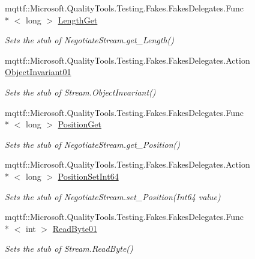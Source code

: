 \begin{DoxyCompactItemize}
mqttf\-::\-Microsoft.\-Quality\-Tools.\-Testing.\-Fakes.\-Fakes\-Delegates.\-Func\\*
$<$ long $>$ \hyperlink{class_system_1_1_net_1_1_security_1_1_fakes_1_1_stub_negotiate_stream_a05dd425c3198fd6996afdfe4f1eacf0c}{Length\-Get}
\begin{DoxyCompactList}\small\item\em Sets the stub of Negotiate\-Stream.\-get\-\_\-\-Length()\end{DoxyCompactList}\item 
mqttf\-::\-Microsoft.\-Quality\-Tools.\-Testing.\-Fakes.\-Fakes\-Delegates.\-Action \hyperlink{class_system_1_1_net_1_1_security_1_1_fakes_1_1_stub_negotiate_stream_a987d678ab55b4945bf27d7d583ab6486}{Object\-Invariant01}
\begin{DoxyCompactList}\small\item\em Sets the stub of Stream.\-Object\-Invariant()\end{DoxyCompactList}\item 
mqttf\-::\-Microsoft.\-Quality\-Tools.\-Testing.\-Fakes.\-Fakes\-Delegates.\-Func\\*
$<$ long $>$ \hyperlink{class_system_1_1_net_1_1_security_1_1_fakes_1_1_stub_negotiate_stream_a66515add28041c4871c4cb5b632c3e7d}{Position\-Get}
\begin{DoxyCompactList}\small\item\em Sets the stub of Negotiate\-Stream.\-get\-\_\-\-Position()\end{DoxyCompactList}\item 
mqttf\-::\-Microsoft.\-Quality\-Tools.\-Testing.\-Fakes.\-Fakes\-Delegates.\-Action\\*
$<$ long $>$ \hyperlink{class_system_1_1_net_1_1_security_1_1_fakes_1_1_stub_negotiate_stream_a396c03ee3a858c2bb1ea7659b7c8d63a}{Position\-Set\-Int64}
\begin{DoxyCompactList}\small\item\em Sets the stub of Negotiate\-Stream.\-set\-\_\-\-Position(\-Int64 value)\end{DoxyCompactList}\item 
mqttf\-::\-Microsoft.\-Quality\-Tools.\-Testing.\-Fakes.\-Fakes\-Delegates.\-Func\\*
$<$ int $>$ \hyperlink{class_system_1_1_net_1_1_security_1_1_fakes_1_1_stub_negotiate_stream_a5048cdb36f65029dd336dd813b4df695}{Read\-Byte01}
\begin{DoxyCompactList}\small\item\em Sets the stub of Stream.\-Read\-Byte()\end{DoxyCompactList}\item 

\end{DoxyCompactItemize}
